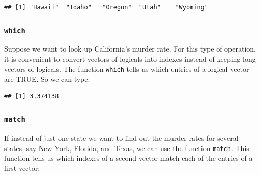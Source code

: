 \documentclass[
]{article}
\newenvironment{Shaded}{\begin{snugshade}}{\end{snugshade}}
\newcommand{\FunctionTok}[1]{\textcolor[rgb]{0.13,0.29,0.53}{\textbf{#1}}}
\newcommand{\NormalTok}[1]{#1}
\newcommand{\OtherTok}[1]{\textcolor[rgb]{0.56,0.35,0.01}{#1}}
\newcommand{\SpecialCharTok}[1]{\textcolor[rgb]{0.81,0.36,0.00}{\textbf{#1}}}
\newcommand{\StringTok}[1]{\textcolor[rgb]{0.31,0.60,0.02}{#1}}
\begin{document}
\begin{Shaded}
\end{Shaded}

\begin{verbatim}
## [1] "Hawaii"  "Idaho"   "Oregon"  "Utah"    "Wyoming"
\end{verbatim}

\subsubsection{\texorpdfstring{\texttt{which}}{which}}\label{which}

Suppose we want to look up California's murder rate. For this type of
operation, it is convenient to convert vectors of logicals into indexes
instead of keeping long vectors of logicals. The function \texttt{which}
tells us which entries of a logical vector are TRUE. So we can type:

\begin{Shaded}
\end{Shaded}

\begin{verbatim}
## [1] 3.374138
\end{verbatim}

\subsubsection{\texorpdfstring{\texttt{match}}{match}}\label{match}

If instead of just one state we want to find out the murder rates for
several states, say New York, Florida, and Texas, we can use the
function \texttt{match}. This function tells us which indexes of a
second vector match each of the entries of a first vector:

\begin{Shaded}
\end{Shaded}
\end{document}

